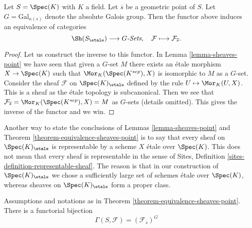 \begin{theorem}
\label{theorem-equivalence-sheaves-point}
Let $S = \Spec(K)$ with $K$ a field.
Let $\overline{s}$ be a geometric point of $S$.
Let $G = \text{Gal}_{\kappa(s)}$ denote the absolute Galois group.
Then the functor above induces an equivalence of categories
$$
\Sh(S_\etale) \longrightarrow G\textit{-Sets},
\quad
\mathcal{F} \longmapsto \mathcal{F}_{\overline{s}}.
$$
\end{theorem}

\begin{proof}
Let us construct the inverse to this functor. In
Lemma \ref{lemma-sheaves-point}
we have seen that given a $G$-set $M$ there exists an \'etale morphism
$X \to \Spec(K)$
such that $\Mor_K(\Spec(K^{sep}), X)$ is
isomorphic to $M$ as a $G$-set. Consider the sheaf
$\mathcal{F}$ on $\Spec(K)_\etale$ defined by
the rule $U \mapsto \Mor_K(U, X)$. This is a sheaf as the \'etale
topology is subcanonical. Then we see that
$\mathcal{F}_{\overline{s}} = \Mor_K(\Spec(K^{sep}), X) = M$
as $G$-sets (details omitted). This gives the inverse of the functor and
we win.
\end{proof}

\begin{remark}
\label{remark-every-sheaf-representable}
Another way to state the conclusions of
Lemmas \ref{lemma-sheaves-point} and
Theorem \ref{theorem-equivalence-sheaves-point}
is to say that every sheaf on $\Spec(K)_\etale$ is representable
by a scheme $X$ \'etale over $\Spec(K)$.
This does not mean that every sheaf is representable in the sense of
Sites, Definition \ref{sites-definition-representable-sheaf}.
The reason is that in our construction of $\Spec(K)_\etale$
we chose a sufficiently large set of schemes \'etale over $\Spec(K)$,
whereas sheaves on $\Spec(K)_\etale$ form a proper class.
\end{remark}

\begin{lemma}
\label{lemma-global-sections-point}
Assumptions and notations as in
Theorem \ref{theorem-equivalence-sheaves-point}.
There is a functorial bijection
$$
\Gamma(S, \mathcal{F}) = (\mathcal{F}_{\overline{s}})^G
$$
\end{lemma}


